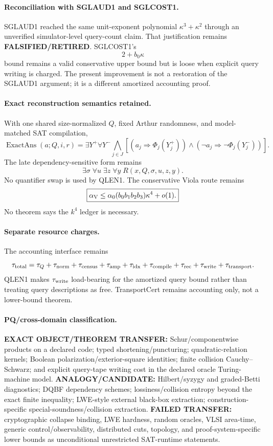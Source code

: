 \documentclass[11pt]{article}
\begin{document}
\paragraph{Reconciliation with SGLAUD1 and SGLCOST1.}
SGLAUD1 reached the same unit-exponent polynomial \(\kappa^3+\kappa^2\) through an unverified simulator-level query-count claim. That justification remains \textbf{FALSIFIED/RETIRED}. SGLCOST1's
\[
2+b_0\kappa
\]
bound remains a valid conservative upper bound but is loose when explicit query writing is charged. The present improvement is not a restoration of the SGLAUD1 argument; it is a different amortized accounting proof.

\paragraph{Exact reconstruction semantics retained.}
With one shared size-normalized \(Q\), fixed Arthur randomness, and model-matched SAT compilation,
\[
\operatorname{ExactAns}(a;Q,i,r)
=
\exists Y^+\forall Y^-
\bigwedge_{j\in J}
\left[
(a_j\Rightarrow\Phi_j(Y_j^+))
\wedge
(\neg a_j\Rightarrow\neg\Phi_j(Y_j^-))
\right].
\]
The late dependency-sensitive form remains
\[
\boxed{\exists\sigma\;\forall u\;\exists z\;\forall y\;R(x,Q,\sigma,u,z,y).}
\]
No quantifier swap is used by QLEN1. The conservative Viola route remains
\[
\boxed{
\alpha_{\rm V}\le
\alpha_0(b_0b_1b_2b_3)\kappa^4+o(1).
}
\]
No theorem says the \(k^4\) ledger is necessary.

\paragraph{Separate resource charges.}
The accounting interface remains
\[
\tau_{\rm total}=
\tau_Q+\tau_{\rm norm}+\tau_{\rm census}+\tau_{\rm amp}
+\tau_{\rm idx}+\tau_{\rm compile}+\tau_{\rm rec}
+\tau_{\rm write}+\tau_{\rm transport}.
\]
QLEN1 makes \(\tau_{\rm write}\) load-bearing for the amortized query bound rather than treating query descriptions as free. TransportCert remains accounting only, not a lower-bound theorem.

\paragraph{PQ/cross-domain classification.}
\textbf{EXACT OBJECT/THEOREM TRANSFER:} Schur/componentwise products on a declared code; typed shortening/puncturing; quadratic-relation kernels; Boolean polarization/exterior-square identities; finite collision Cauchy--Schwarz; and explicit query-tape writing cost in the declared oracle Turing-machine model.
\textbf{ANALOGY/CANDIDATE:} Hilbert/syzygy and graded-Betti diagnostics; DQBF dependency schemes; lossiness/collision entropy beyond the exact finite inequality; LWE-style external black-box extraction; construction-specific special-soundness/collision extraction.
\textbf{FAILED TRANSFER:} cryptographic collapse binding, LWE hardness, random oracles, VLSI area-time, generic control/observability, distributed cuts, topology, and proof-system-specific lower bounds as unconditional unrestricted SAT-runtime statements.
\end{document}
